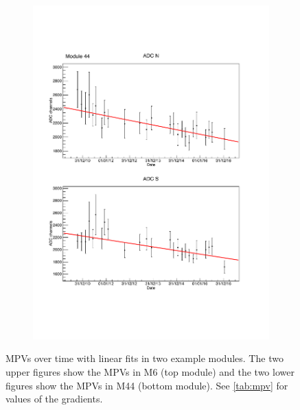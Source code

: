 \begin{figure}[hp!]
\begin{subfigure}{0.6\linewidth}
    \includegraphics[width=\linewidth{}]{./fig/M44mpv.pdf}
    \caption{}
    \label{fig:MPV_M44}
  \end{subfigure}
  \caption{MPVs over time with linear fits in two example modules. The two upper figures show the MPVs in M6 (top module) and the two lower figures show the MPVs in M44 (bottom module). See \ref{tab:mpv} for values of the gradients.}
  \label{fig:MPV}
\end{figure}

%

